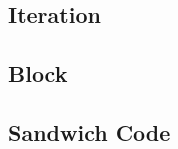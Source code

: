 \subsection{Iteration}

\subsection{Block}

\subsection{Sandwich Code}
































